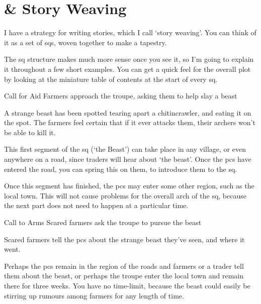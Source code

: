 \chapter{ \& Story Weaving}

\label{sidequests}


\begin{multicols}{2}

\noindent
I have a strategy for writing stories, which I call `story weaving'.
You can think of it as a set of \glspl{sq}, woven together to make a tapestry.

The \gls{sq} structure makes much more sense once you see it, so I'm going to explain it throughout a few short examples.
You can get a quick feel for the overall plot by looking at the miniature table of contents at the start of every \gls{sq}.


{Call for Aid}%
{Farmers approach the troupe, asking them to help slay a beast}%

\begin{exampletext}
  A strange beast has been spotted tearing apart a chitincrawler, and eating it on the spot.
  The farmers feel certain that if it ever attacks them, their archers won't be able to kill it.
\end{exampletext}

This first \gls{segment} of the \gls{sq} (`the Beast') can take place in any \gls{village}, or even anywhere on a road, since traders will hear about `the beast'.
Once the \glspl{pc} have entered the road, you can spring this on them, to introduce them to the \gls{sq}.

Once this \gls{segment} has finished, the \glspl{pc} may enter some other region, such as the local town.
This will not cause problems for the overall arch of the \gls{sq}, because the next part does not need to happen at a particular time.

{Call to Arms}%
{Scared farmers ask the troupe to pursue the beast}%

\begin{exampletext}
  Scared farmers tell the \glspl{pc} about the strange beast they've seen, and where it went.
\end{exampletext}

Perhaps the \glspl{pc} remain in the region of the roads and farmers or a trader tell them about the beast, or perhaps the troupe enter the local town and remain there for three weeks.
You have no time-limit, because the beast could easily be stirring up rumours among farmers for any length of time.


\end{multicols}
